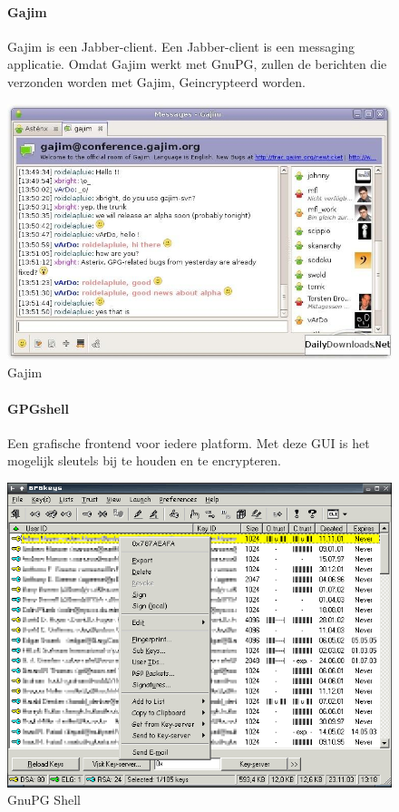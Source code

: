 \documentclass[12pt]{article}
\begin{document}
				\begin{figure}[!ht]
					\paragraph{Gajim}
						Gajim is een Jabber-client. Een Jabber-client is een messaging applicatie.
						Omdat Gajim werkt met GnuPG, zullen de berichten die verzonden worden met 								Gajim, Geincrypteerd worden.
					\begin{center}
						\includegraphics[scale=0.4]{Pictures/gajim}
					\end{center}
					\caption{Gajim}
				\end{figure}	

				\begin{figure}[!ht]
					\paragraph{GPGshell}
						Een grafische frontend voor iedere platform. Met deze GUI is het mogelijk 								sleutels bij te houden en te encrypteren. 
					\begin{center}
						\includegraphics[scale=0.5]{Pictures/gpgshell}
					\end{center}
					\caption{GnuPG Shell}
				\end{figure}
					
\end{document}

